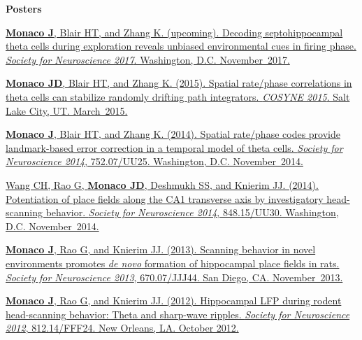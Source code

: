 \documentclass[10pt]{article}
\begin{document}
\begin{description}
\item \textbf{Posters}
\item[\quad] \href{http://www.abstractsonline.com/pp8/#!/4376/presentation/6085}{\textbf{Monaco J}, Blair HT, and Zhang K. (upcoming). Decoding septohippocampal theta cells during exploration reveals unbiased environmental cues in firing phase. \emph{Society for Neuroscience 2017}. Washington, D.C. November~2017.}
\item[\quad] \href{http://jdmonaco.com/files/monaco-paper-cosyne15.pdf}{\textbf{Monaco JD}, Blair HT, and Zhang K. (2015). Spatial rate/phase correlations in theta cells can stabilize randomly drifting path integrators. \emph{COSYNE 2015}. Salt Lake City, UT. March~2015.}
\item[\quad] \href{http://www.abstractsonline.com/Plan/ViewAbstract.aspx?sKey=973d2662-ba7a-4ad2-aff9-fe0d4b77c262&cKey=9917ffaf-9e31-4213-acb9-4aab498ab4cd&mKey=54c85d94-6d69-4b09-afaa-502c0e680ca7}{\textbf{Monaco J}, Blair HT, and Zhang K. (2014). Spatial rate/phase codes provide landmark-based error correction in a temporal model of theta cells. \emph{Society for Neuroscience 2014}, 752.07/UU25. Washington, D.C. November~2014.}
\item[\quad] \href{http://www.abstractsonline.com/Plan/ViewAbstract.aspx?sKey=bfb59866-8deb-44a6-9515-a7aab630507b&cKey=d201b3aa-7725-452e-b0dd-c41d204b5b54&mKey=54c85d94-6d69-4b09-afaa-502c0e680ca7}{Wang CH, Rao G, \textbf{Monaco JD}, Deshmukh SS, and Knierim JJ. (2014). Potentiation of place fields along the CA1 transverse axis by investigatory head-scanning behavior. \emph{Society for Neuroscience 2014}, 848.15/UU30. Washington, D.C. November~2014.}
\item[\quad] \href{http://www.abstractsonline.com/Plan/ViewAbstract.aspx?sKey=32eccac1-4e1d-4e81-bf5c-f39bcb605757&cKey=4710dece-cc8e-4b48-8764-49ea174b91ef&mKey=8d2a5bec-4825-4cd6-9439-b42bb151d1cf}{\textbf{Monaco J}, Rao G, and Knierim JJ. (2013). Scanning behavior in novel environments promotes \emph{de novo} formation of hippocampal place fields in rats. \emph{Society for Neuroscience 2013}, 670.07/JJJ44. San Diego, CA. November~2013.}
\item[\quad] \href{http://www.abstractsonline.com/Plan/ViewAbstract.aspx?sKey=f5b9fa94-7d15-48c7-9d67-b89cd2883025&cKey=a53349ca-41b1-4664-b022-85d0d1fe59b8&mKey=\%7b70007181-01C9-4DE9-A0A2-EEBFA14CD9F1\%7d}{\textbf{Monaco J}, Rao G, and Knierim JJ. (2012). Hippocampal LFP during rodent head-scanning behavior: Theta and sharp-wave ripples. \emph{Society for Neuroscience 2012}, 812.14/FFF24. New Orleans, LA. October 2012.}

\end{description}
\end{document}
